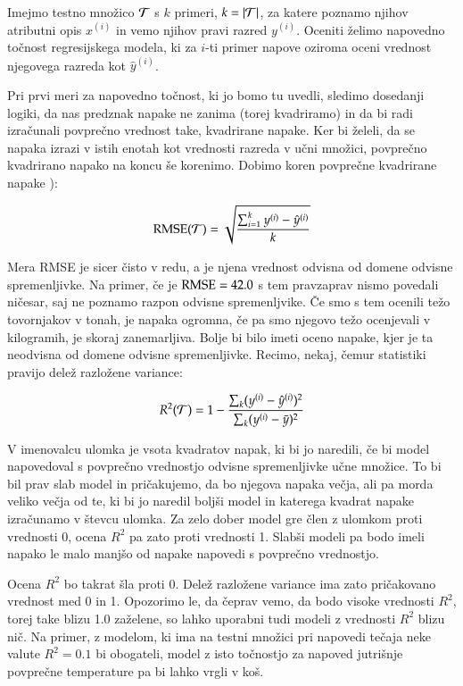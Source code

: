 Imejmo testno množico $\cal{T}$ s $k$ primeri, $k=|\cal{T}|$, za katere poznamo njihov atributni opis $x^{(i)}$ in vemo njihov pravi razred $y^{(i)}$. Oceniti želimo napovedno točnost regresijskega modela, ki za $i$-ti primer napove oziroma oceni vrednost njegovega razreda kot $\hat{y}^{(i)}$.

Pri prvi meri za napovedno točnost, ki jo bomo tu uvedli, sledimo dosedanji logiki, da nas predznak napake ne zanima (torej kvadriramo) in da bi radi izračunali povprečno vrednost take, kvadrirane napake. Ker bi želeli, da se napaka izrazi v istih enotah kot vrednosti razreda v učni množici, povprečno kvadrirano napako na koncu še korenimo. Dobimo koren povprečne kvadrirane napake ):

$$ {\rm RMSE}(\cal{T})=\sqrt{\sum_{i=1}^k{y^{(i)}-\hat{y}^{(i)}}\over k} $$

Mera RMSE je sicer čisto v redu, a je njena vrednost odvisna od domene odvisne spremenljivke. Na primer, če je ${\rm RMSE}=42.0$ s tem pravzaprav nismo povedali ničesar, saj ne poznamo razpon odvisne spremenljvike. Če smo s tem ocenili težo tovornjakov v tonah, je napaka ogromna, če pa smo njegovo težo ocenjevali v kilogramih, je skoraj zanemarljiva. Bolje bi bilo imeti oceno napake, kjer je ta neodvisna od domene odvisne spremenljivke. Recimo, nekaj, čemur statistiki pravijo delež razložene variance:

$$ R^2({\cal T})=1-{\sum_k (y^{(i)}-\hat{y}^{(i)})^2
  \over \sum_k(y^{(i)}-\bar{y})^2} $$

V imenovalcu ulomka je vsota kvadratov napak, ki bi jo naredili, če bi model napovedoval s povprečno vrednostjo odvisne spremenljivke učne množice. To bi bil prav slab model in pričakujemo, da bo njegova napaka večja, ali pa morda veliko večja od te, ki bi jo naredil boljši model in katerega kvadrat napake izračunamo v števcu ulomka. Za zelo dober model gre člen z ulomkom proti vrednosti 0, ocena $R^2$ pa zato proti vrednosti 1. Slabši modeli pa bodo imeli napako le malo manjšo od napake napovedi s povprečno vrednostjo.

Ocena $R^2$ bo takrat šla proti 0. Delež razložene variance ima zato pričakovano vrednost med 0 in 1. Opozorimo le, da čeprav vemo, da bodo visoke vrednosti $R^2$, torej take blizu 1.0 zaželene, so lahko uporabni tudi modeli z vrednosti $R^2$ blizu nič. Na primer, z modelom, ki ima na testni množici pri napovedi tečaja neke valute $R^2=0.1$ bi obogateli, model z isto točnostjo za napoved jutrišnje povprečne temperature pa bi lahko vrgli v koš.

